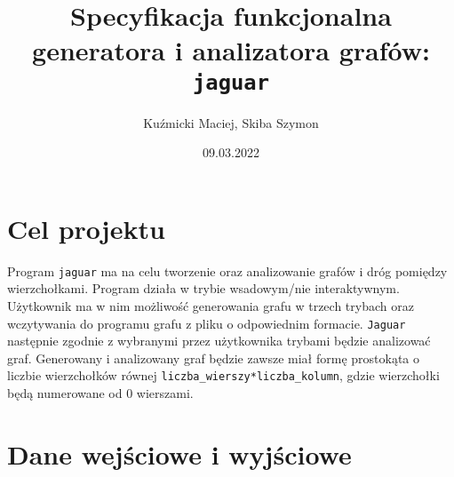 \documentclass[]{article}
\title{Specyfikacja funkcjonalna generatora i analizatora grafów: \texttt{jaguar}}
\author{Kuźmicki Maciej, Skiba Szymon}
\date{09.03.2022}
\begin{document}
\maketitle
\thispagestyle{fancy}
\section{Cel projektu}\label{header-n231}
Program \texttt{jaguar} ma na celu tworzenie oraz analizowanie grafów i dróg pomiędzy wierzchołkami. Program działa w trybie wsadowym/nie interaktywnym. Użytkownik ma w nim możliwość generowania grafu w trzech trybach oraz wczytywania do programu grafu z pliku o odpowiednim formacie. \texttt{Jaguar} następnie zgodnie z wybranymi przez użytkownika trybami będzie analizować graf.  Generowany i analizowany graf będzie zawsze miał formę prostokąta o liczbie wierzchołków równej \verb|liczba_wierszy*liczba_kolumn|,  gdzie wierzchołki będą numerowane od 0 wierszami.

\section{Dane wejściowe i wyjściowe}\label{header-n233}
\end{document}
